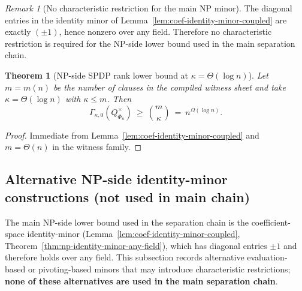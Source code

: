 \documentclass[12pt]{article}
\newtheorem{theorem}{Theorem}
\theoremstyle{definition}
\theoremstyle{definition}
\theoremstyle{remark}
\newtheorem{remark}{Remark}
\theoremstyle{remark}
\begin{document}
\begin{remark}[No characteristic restriction for the main NP minor]
\label{rem:no-char-needed}\label{rem:char-identity-minor}
The diagonal entries in the identity minor of Lemma~\ref{lem:coef-identity-minor-coupled}
are exactly $(\pm 1)$, hence nonzero over any field. Therefore no characteristic
restriction is required for the NP-side lower bound used in the main separation chain.
\end{remark}

\begin{theorem}[NP-side SPDP rank lower bound at $\kappa=\Theta(\log n)$]
\label{thm:np-rank-lower}
Let $m=m(n)$ be the number of clauses in the compiled witness sheet and take
$\kappa=\Theta(\log n)$ with $\kappa\le m$. Then
\[
\Gamma_{\kappa,0}\!\left(Q^\times_{\Phi_n}\right)\ \ge\ \binom{m}{\kappa}
\ =\ n^{\Omega(\log n)}.
\]
\end{theorem}

\begin{proof}
Immediate from Lemma~\ref{lem:coef-identity-minor-coupled} and $m=\Theta(n)$ in the witness family.
\end{proof}



\subsection{Alternative NP-side identity-minor constructions (not used in main chain)}
\label{app:alt-np-minors}

The main NP-side lower bound used in the separation chain is the coefficient-space
identity-minor (Lemma~\ref{lem:coef-identity-minor-coupled}, Theorem~\ref{thm:np-identity-minor-any-field}),
which has diagonal entries $\pm 1$ and therefore holds over any field.
This subsection records alternative evaluation-based or pivoting-based minors that may
introduce characteristic restrictions; \textbf{none of these alternatives are used in the
main separation chain}.
\end{document}
